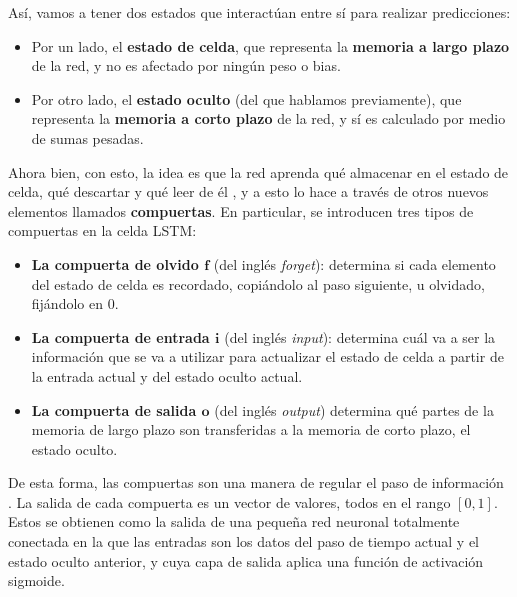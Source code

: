 \documentclass[../../main.tex]{subfiles}
\begin{document}
Así, vamos a tener dos estados que interactúan entre sí para realizar predicciones:
\begin{itemize}
    \item Por un lado, el \textbf{estado de celda}, que representa la \textbf{memoria a largo
    plazo} de la red, y no es afectado por ningún peso o bias.
    \item Por otro lado, el \textbf{estado oculto} (del que hablamos previamente), que
    representa la \textbf{memoria a corto plazo} de la red, y sí es calculado por medio
    de sumas pesadas.
\end{itemize}

Ahora bien, con esto, la idea es que la red aprenda qué almacenar en el estado de celda,
qué descartar y qué leer de él \cite{hands-on-ML-sklearn-tf}, y a esto lo hace a través de
otros nuevos elementos llamados \textbf{compuertas}. En particular, se introducen tres
tipos de compuertas en la celda LSTM:
\begin{itemize}
    \item \textbf{La compuerta de olvido \(\bm{f}\)} (del inglés \textit{forget}):
    determina si cada elemento del estado de celda es recordado, copiándolo al paso
    siguiente, u olvidado, fijándolo en 0.
    \item \textbf{La compuerta de entrada \(\bm{i}\)} (del inglés \textit{input}):
    determina cuál va a ser la información que se va a utilizar para actualizar
    el estado de celda a partir de la entrada actual y del estado oculto actual.
    \item \textbf{La compuerta de salida \(\bm{o}\)} (del inglés \textit{output})
    determina qué partes de la memoria de largo plazo son transferidas a la memoria
    de corto plazo, el estado oculto.
\end{itemize}

De esta forma, las compuertas son una manera de regular el paso de información
\cite{colahs-blog-lstm-2015}. La salida de cada compuerta es un vector de valores, todos en
el rango \([0,1]\). Estos se obtienen como la salida de una pequeña red neuronal
totalmente conectada en la que las entradas son los datos del paso de tiempo actual y el
estado oculto anterior, y cuya capa de salida aplica una función de activación sigmoide.
\end{document}
